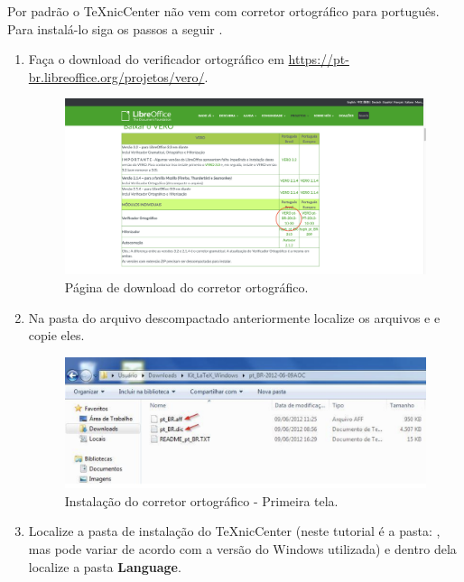Por padrão o TeXnicCenter não vem com corretor ortográfico para português. Para instalá-lo siga os passos a seguir \cite{texnic}.

\begin{enumerate}
\item Faça o download do verificador ortográfico em \url{https://pt-br.libreoffice.org/projetos/vero/}.
\begin{figure}[H]
  \centering
  \includegraphics[width=1.0\textwidth]{./fig/vero01}
  \caption{Página de download do corretor ortográfico.}
\end{figure}
\item Na pasta do arquivo descompactado anteriormente localize os arquivos  e  e copie eles.
\begin{figure}[H]
  \centering
  \includegraphics[width=1.0\textwidth]{./fig/vero02}
  \caption{Instalação do corretor ortográfico - Primeira tela.}
\end{figure}
\item Localize a pasta de instalação do TeXnicCenter (neste tutorial é a pasta: , mas pode variar de acordo com a versão do Windows utilizada) e dentro dela localize a pasta \textbf{Language}.
\begin{figure}[H]
  \centering

\end{figure}
\end{enumerate}
